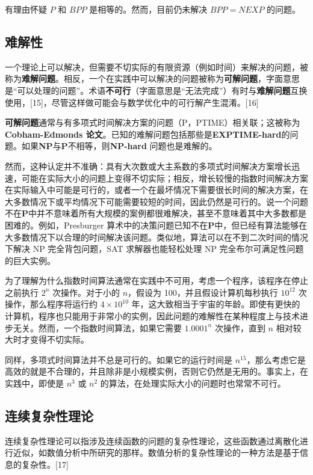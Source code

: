 有理由怀疑 \( P \) 和 \( BPP \) 是相等的。然而，目前仍未解决 \( BPP = NEXP \) 的问题。

\subsection{难解性}
一个理论上可以解决，但需要不切实际的有限资源（例如时间）来解决的问题，被称为\textbf{难解问题}。相反，一个在实践中可以解决的问题被称为\textbf{可解问题}，字面意思是“可以处理的问题”。术语\textbf{不可行}（字面意思是“无法完成”）有时与\textbf{难解问题}互换使用，[15]，尽管这样做可能会与数学优化中的可行解产生混淆。[16]

\textbf{可解问题}通常与有多项式时间解决方案的问题（P，PTIME）相关联；这被称为\textbf{Cobham-Edmonds 论文}。已知的难解问题包括那些是\textbf{EXPTIME-hard}的问题。如果\textbf{NP}与\textbf{P}不相等，则\textbf{NP-hard} 问题也是难解的。

然而，这种认定并不准确：具有大次数或大主系数的多项式时间解决方案增长迅速，可能在实际大小的问题上变得不切实际；相反，增长较慢的指数时间解决方案在实际输入中可能是可行的，或者一个在最坏情况下需要很长时间的解决方案，在大多数情况下或平均情况下可能需要较短的时间，因此仍然是可行的。说一个问题不在\textbf{P}中并不意味着所有大规模的案例都很难解决，甚至不意味着其中大多数都是困难的。例如，Presburger 算术中的决策问题已知不在\textbf{P}中，但已经有算法能够在大多数情况下以合理的时间解决该问题。类似地，算法可以在不到二次时间的情况下解决 NP 完全背包问题，SAT 求解器也能轻松处理 NP 完全布尔可满足性问题的巨大实例。

为了理解为什么指数时间算法通常在实践中不可用，考虑一个程序，该程序在停止之前执行 \(2^n\) 次操作。对于小的 \(n\)，假设为 100，并且假设计算机每秒执行 \(10^{12}\) 次操作，那么程序将运行约 \(4 \times 10^{10}\) 年，这大致相当于宇宙的年龄。即使有更快的计算机，程序也只能用于非常小的实例，因此问题的难解性在某种程度上与技术进步无关。然而，一个指数时间算法，如果它需要 \(1.0001^n\) 次操作，直到 \(n\) 相对较大时才变得不切实际。

同样，多项式时间算法并不总是可行的。如果它的运行时间是 \(n^{15}\)，那么考虑它是高效的就是不合理的，并且除非是小规模实例，否则它仍然是无用的。事实上，在实践中，即使是 \(n^3\) 或 \(n^2\) 的算法，在处理实际大小的问题时也常常不可行。
\subsection{连续复杂性理论}
连续复杂性理论可以指涉及连续函数的问题的复杂性理论，这些函数通过离散化进行近似，如数值分析中所研究的那样。数值分析的复杂性理论的一种方法是基于信息的复杂性。[17]


